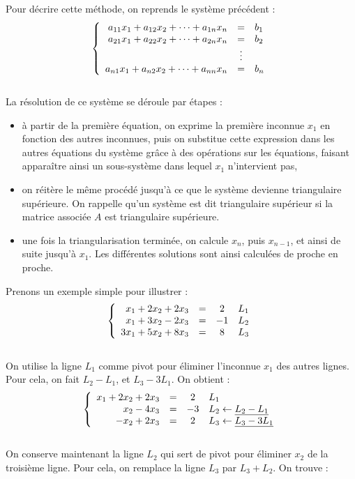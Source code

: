 \documentclass[a4paper,12pt]{report}
\begin{document}
Pour décrire cette méthode, on reprends le système précédent : 
\[
\left\{
\begin{array}{r  c l}
a_{11}x_1+a_{12}x_2+\cdots+a_{1n}x_n &=& b_1\\
a_{21}x_1+a_{22}x_2+\cdots+a_{2n}x_n &=& b_2\\
&\vdots&\\
a_{n1}x_1+a_{n2}x_2+\cdots+a_{nn}x_n &=& b_n
\end{array}
\right.
\]\\
La résolution de ce système se déroule par étapes :
\begin{itemize}
	\item à partir de la première équation, on exprime la première inconnue $x_1$ en fonction des autres inconnues, puis on substitue cette expression dans les autres équations du système grâce à des opérations sur les équations, faisant apparaître ainsi un sous-système dans lequel $x_1$ n'intervient pas,
	\item on réitère le même procédé jusqu'à ce que le système devienne triangulaire supérieure. On rappelle qu'un système est dit triangulaire supérieur si la matrice associée $A$ est triangulaire supérieure.
	\item une fois la triangularisation terminée, on calcule $x_n$, puis $x_{n-1}$, et ainsi de suite jusqu'à $x_1$.  Les différentes solutions sont ainsi calculées de proche en proche.
	\\
\end{itemize}
Prenons un exemple simple pour illustrer :
\[
\left\{
\begin{array}{r c c l}
x_1+2x_2+2x_3 &=&2&L_1\\
x_1+3x_2-2x_3&=&-1&L_2\\
3x_1+5x_2+8x_3&=&8&L_3
\end{array}
\right.
\]\\
On utilise la ligne $L_1$ comme pivot pour éliminer l'inconnue $x_1$ des autres lignes. Pour cela, on fait $L_2-L_1$, et $L_3 - 3L_1$. On obtient :
\[
\left\{
\begin{array}{r c c l}
x_1+2x_2+2x_3 &=&2&L_1\\
x_2-4x_3&=&-3&L_2\leftarrow \underline{L_2-L_1}\\
-x_2+2x_3&=&2&L_3\leftarrow \underline{L_3-3L_1}
\end{array}
\right.
\]\\
On conserve maintenant la ligne $L_2$ qui sert de pivot pour éliminer $x_2$ de la troisième ligne. Pour cela, on remplace la ligne $L_3$ par $L_3+L_2$. On trouve :
\end{document}
